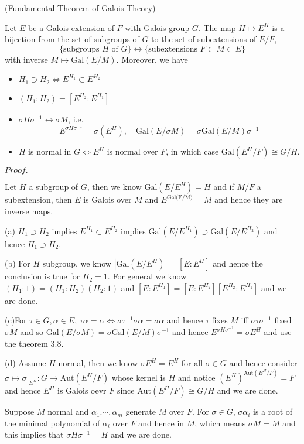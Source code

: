 \documentclass{article}
\newcommand{\Pf}[1]{$Proof.$\par}
\begin{document}
\begin{theorem}
    (Fundamental Theorem of Galois Theory)\par
    Let $E$ be a Galois extension of $F$ with Galois group $G$. The map $H\mapsto E^H$ is a bijection from the set of subgroups of $G$ to the set of subextensions of $E/F$,
    \[
    \{\text{subgroups }H\text{ of }G\}\leftrightarrow\{\text{subextensions }F\subset M \subset E\}
    \]
    with inverse $M\mapsto \text{Gal}(E/M)$. Moreover, we have
    \begin{itemize}
        \item $H_1 \supset H_2 \Leftrightarrow E^{H_1} \subset E^{H_2}$
        \item $(H_1:H_2) = [E^{H_2}:E^{H_1}]$
        \item $\sigma H \sigma^{-1} \leftrightarrow \sigma M$, i.e.
        \[ E^{\sigma H \sigma^{-1}} = \sigma(E^H),\quad \text{Gal}(E/\sigma M) = \sigma \text{Gal}(E/M)\sigma^{-1} \]
        \item $H$ is normal in $G \Leftrightarrow E^H$ is normal over $F$, in which case $\text{Gal}(E^H/F) \cong G/H$.
    \end{itemize} 
\end{theorem}
\Pf\par
    Let $H$ a subgroup of $G$, then we know $\text{Gal}(E/E^H) = H$ and if $M/F$ a subextension, then $E$ is Galois over $M$ and $E^{\text{Gal(E/M)}} = M$ and hence they are inverse maps.\par
    (a) $H_1 \supset H_2$ implies $E^{H_1} \subset E^{H_2}$ implies $\text{Gal}(E/E^{H_1}) \supset \text{Gal}(E/E^{H_2})$ and hence $H_1 \supset H_2$.\par
    (b) For $H$ subgroup, we know $|\text{Gal}(E/E^H)| = [E:E^H]$ and hence the conclusion is true for $H_2 = 1$. For general we know $(H_1:1) = (H_1:H_2)(H_2:1)$ and $[E:E^{H_1}] = [E:E^{H_2}][E^{H_2}:E^{H_1}]$ and we are done.\par
    (c)For $\tau \in G, \alpha \in E$, $\tau \alpha = \alpha \Leftrightarrow \sigma\tau^{-1}\sigma\alpha = \sigma\alpha$ and hence $\tau$ fixes $M$ iff $\sigma\tau\sigma^{-1}$ fixed $\sigma M$ and so $\text{Gal}(E/\sigma M) = \sigma\text{Gal}(E/M)\sigma^{-1}$ and hence $E^{\sigma H \sigma^{-1}} = \sigma E^{H}$ and use the theorem 3.8.\par
    (d) Assume $H$ normal, then we know $\sigma E^H = E^H$ for all $\sigma\in G$ and hence consider $\sigma\mapsto \sigma|_{E^H}: G \to \text{Aut}(E^H/F)$ whose kernel is $H$ and notice $(E^H)^{\text{Aut}(E^H/F)} = F$ and hence $E^H$ is Galois oevr $F$ since $\text{Aut}(E^H/F) \cong G/H$ and we are done.\par
    Suppose $M$ normal and $\alpha_1.\cdots,\alpha_m$ generate $M$ over $F$. For $\sigma \in G$, $\sigma\alpha_i$ is a root of the minimal polynomial of $\alpha_i$ over $F$ and hence in $M$, which means $\sigma M = M$ and this implies that $\sigma H \sigma^{-1} = H$ and we are done.
\end{document}
